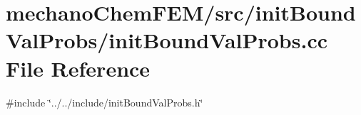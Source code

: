 \section{mechano\+Chem\+F\+E\+M/src/init\+Bound\+Val\+Probs/init\+Bound\+Val\+Probs.cc File Reference}
\label{init_bound_val_probs_8cc}
{\ttfamily \#include \char`\"{}../../include/init\+Bound\+Val\+Probs.\+h\char`\"{}}\newline
